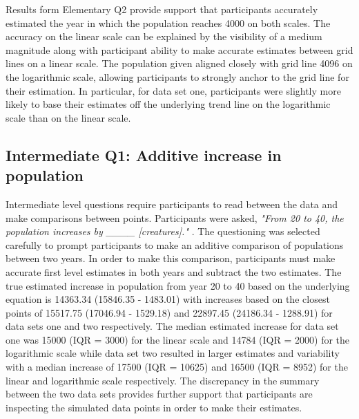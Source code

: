 \documentclass[print]{nuthesis}
\begin{document}
Results form Elementary Q2 provide support that participants accurately estimated the year in which the population reaches 4000 on both scales.
The accuracy on the linear scale can be explained by the visibility of a medium magnitude along with participant ability to make accurate estimates between grid lines on a linear scale.
The population given aligned closely with grid line 4096 on the logarithmic scale, allowing participants to strongly anchor to the grid line for their estimation.
In particular, for data set one, participants were slightly more likely to base their estimates off the underlying trend line on the logarithmic scale than on the linear scale.

\hypertarget{intermediate-q1-additive-increase-in-population}{%
\subsection{Intermediate Q1: Additive increase in population}\label{intermediate-q1-additive-increase-in-population}}

Intermediate level questions require participants to read between the data and make comparisons between points.
Participants were asked, \textit{"From 20 to 40, the population increases by \_\_\_\_ [creatures]."} .
The questioning was selected carefully to prompt participants to make an additive comparison of populations between two years.
In order to make this comparison, participants must make accurate first level estimates in both years and subtract the two estimates.
The true estimated increase in population from year 20 to 40 based on the underlying equation is 14363.34 (15846.35 - 1483.01) with increases based on the closest points of 15517.75 (17046.94 - 1529.18) and 22897.45 (24186.34 - 1288.91) for data sets one and two respectively.
The median estimated increase for data set one was 15000 (IQR = 3000) for the linear scale and 14784 (IQR = 2000) for the logarithmic scale while data set two resulted in larger estimates and variability with a median increase of 17500 (IQR = 10625) and 16500 (IQR = 8952) for the linear and logarithmic scale respectively.
The discrepancy in the summary between the two data sets provides further support that participants are inspecting the simulated data points in order to make their estimates.
\end{document}
